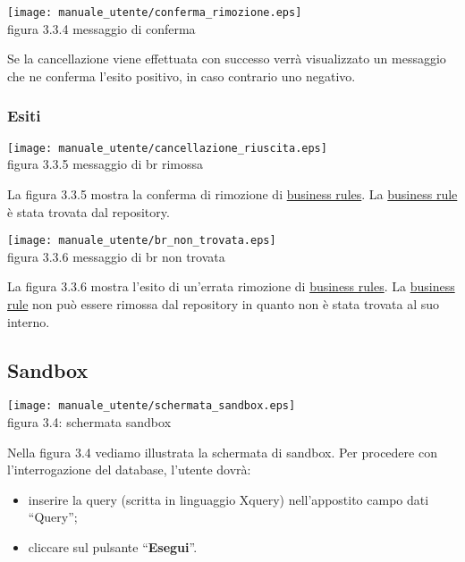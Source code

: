 \begin{center}
\texttt{[image: manuale\_utente/conferma\_rimozione.eps]}\\
 figura 3.3.4 messaggio di conferma
\end{center} 

Se la cancellazione viene effettuata con successo verr\`a visualizzato un messaggio che ne conferma l'esito positivo, in caso contrario uno negativo.
\subsubsection{Esiti}
 
\begin{center}
\texttt{[image: manuale\_utente/cancellazione\_riuscita.eps]}\\
figura 3.3.5 messaggio di br rimossa
\end{center} 
La figura 3.3.5 mostra la conferma di rimozione di \underline{business rules}. La \underline{business rule} \`e stata trovata dal repository.

\begin{center}
\texttt{[image: manuale\_utente/br\_non\_trovata.eps]}\\
 figura 3.3.6 messaggio di br non trovata
\end{center} 
La figura 3.3.6 mostra l'esito di un'errata rimozione di \underline{business rules}. La \underline{business rule} non pu\`o essere rimossa dal repository in quanto non \`e stata trovata al suo interno.

\subsection{Sandbox}
\begin{center}
 \texttt{[image: manuale\_utente/schermata\_sandbox.eps]} \\
 figura 3.4: schermata sandbox
\end{center}
Nella figura 3.4 vediamo illustrata la schermata di sandbox. Per procedere con l'interrogazione del database, l'utente dovr\`a:
\begin{itemize}
\item inserire la query (scritta in linguaggio Xquery) nell'appostito campo dati ``Query'';
\item cliccare sul pulsante ``\textbf{Esegui}''.
\end{itemize}

